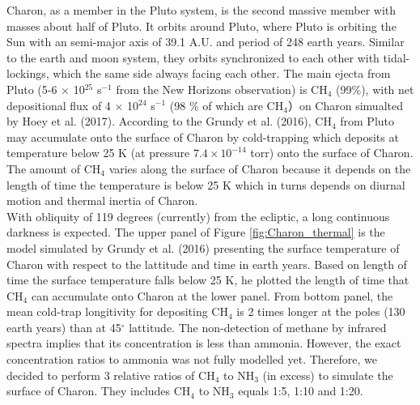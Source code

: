 Charon, as a member in the Pluto system, is the second massive member with masses about half of Pluto. It orbits around Pluto, where Pluto is orbiting the Sun with an semi-major axis of 39.1 A.U. and period of 248 earth years. Similar to the earth and moon system, they orbits synchronized to each other with tidal-lockings, which the same side always facing each other. The main ejecta from Pluto (5-6 $\times$ 10$^{25}$ s$^{-1}$ from the New Horizons observation) is CH$_4$ (99\%), with net depositional flux of 4 $\times$ 10$^{24}$ s$^{-1}$ (98 \% of which are CH$_4$）on Charon simualted by Hoey et al. (2017)\cite{hoey2017rarefied}. According to the Grundy et al. (2016)\cite{grundy2016formation}, CH$_4$ from Pluto may accumulate onto the surface of Charon by cold-trapping which deposits at temperature below 25 K (at pressure $7.4 \times 10^{-14}$ torr) onto the surface of Charon. The amount of CH$_4$ varies along the surface of Charon because it depends on the length of time the temperature is below 25 K which in turns depends on diurnal motion and thermal inertia of Charon.\\

With obliquity of 119 degrees (currently) from the ecliptic, a long continuous darkness is expected. The upper panel of Figure \ref{fig:Charon_thermal} is the model simulated by Grundy et al. (2016)\cite{grundy2016formation} presenting the surface temperature of Charon with respect to the lattitude and time in earth years. Based on length of time the surface temperature falls below 25 K, he plotted the length of time that CH$_4$ can accumulate onto Charon at the lower panel. From bottom panel, the mean cold-trap longitivity for depositing CH$_4$ is 2 times longer at the poles (130 earth years) than at 45$^{\circ}$ lattitude. The non-detection of methane by infrared spectra implies that its concentration is less than ammonia. However, the exact concentration ratios to ammonia was not fully modelled yet. Therefore, we decided to perform 3 relative ratios of CH$_4$ to NH$_3$ (in excess) to simulate the surface of Charon. They includes CH$_4$ to NH$_3$ equals 1:5, 1:10 and 1:20.\\

